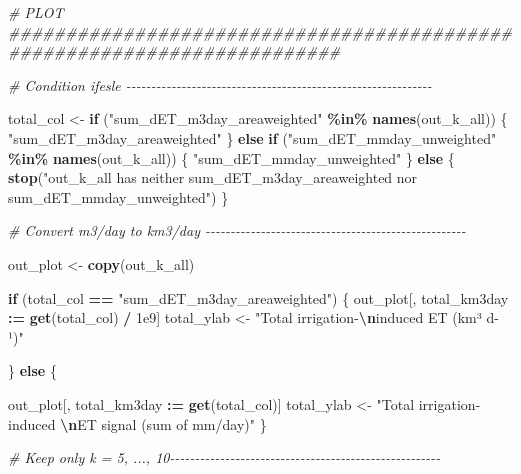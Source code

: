 \documentclass[
  11pt,
]{article}
\newenvironment{Shaded}{\begin{snugshade}}{\end{snugshade}}
\newcommand{\CommentTok}[1]{\textcolor[rgb]{0.56,0.35,0.01}{\textit{#1}}}
\newcommand{\ControlFlowTok}[1]{\textcolor[rgb]{0.13,0.29,0.53}{\textbf{#1}}}
\newcommand{\FloatTok}[1]{\textcolor[rgb]{0.00,0.00,0.81}{#1}}
\newcommand{\FunctionTok}[1]{\textcolor[rgb]{0.13,0.29,0.53}{\textbf{#1}}}
\newcommand{\NormalTok}[1]{#1}
\newcommand{\OtherTok}[1]{\textcolor[rgb]{0.56,0.35,0.01}{#1}}
\newcommand{\SpecialCharTok}[1]{\textcolor[rgb]{0.81,0.36,0.00}{\textbf{#1}}}
\newcommand{\StringTok}[1]{\textcolor[rgb]{0.31,0.60,0.02}{#1}}
\begin{document}
\begin{Shaded}
\begin{Highlighting}[]
\CommentTok{\# PLOT \#\#\#\#\#\#\#\#\#\#\#\#\#\#\#\#\#\#\#\#\#\#\#\#\#\#\#\#\#\#\#\#\#\#\#\#\#\#\#\#\#\#\#\#\#\#\#\#\#\#\#\#\#\#\#\#\#\#\#\#\#\#\#\#\#\#\#\#\#\#\#\#\#}

\CommentTok{\# Condition ifesle {-}{-}{-}{-}{-}{-}{-}{-}{-}{-}{-}{-}{-}{-}{-}{-}{-}{-}{-}{-}{-}{-}{-}{-}{-}{-}{-}{-}{-}{-}{-}{-}{-}{-}{-}{-}{-}{-}{-}{-}{-}{-}{-}{-}{-}{-}{-}{-}{-}{-}{-}{-}{-}{-}{-}{-}{-}{-}{-}{-}{-}}

\NormalTok{total\_col }\OtherTok{\textless{}{-}} \ControlFlowTok{if}\NormalTok{ (}\StringTok{"sum\_dET\_m3day\_areaweighted"} \SpecialCharTok{\%in\%} \FunctionTok{names}\NormalTok{(out\_k\_all)) \{}
  \StringTok{"sum\_dET\_m3day\_areaweighted"}
\NormalTok{\} }\ControlFlowTok{else} \ControlFlowTok{if}\NormalTok{ (}\StringTok{"sum\_dET\_mmday\_unweighted"} \SpecialCharTok{\%in\%} \FunctionTok{names}\NormalTok{(out\_k\_all)) \{}
  \StringTok{"sum\_dET\_mmday\_unweighted"}
\NormalTok{\} }\ControlFlowTok{else}\NormalTok{ \{}
  \FunctionTok{stop}\NormalTok{(}\StringTok{"out\_k\_all has neither sum\_dET\_m3day\_areaweighted nor sum\_dET\_mmday\_unweighted"}\NormalTok{)}
\NormalTok{\}}

\CommentTok{\# Convert m3/day to km3/day {-}{-}{-}{-}{-}{-}{-}{-}{-}{-}{-}{-}{-}{-}{-}{-}{-}{-}{-}{-}{-}{-}{-}{-}{-}{-}{-}{-}{-}{-}{-}{-}{-}{-}{-}{-}{-}{-}{-}{-}{-}{-}{-}{-}{-}{-}{-}{-}{-}{-}{-}{-}}

\NormalTok{out\_plot }\OtherTok{\textless{}{-}} \FunctionTok{copy}\NormalTok{(out\_k\_all)}

\ControlFlowTok{if}\NormalTok{ (total\_col }\SpecialCharTok{==} \StringTok{"sum\_dET\_m3day\_areaweighted"}\NormalTok{) \{}
\NormalTok{  out\_plot[, total\_km3day }\SpecialCharTok{:=} \FunctionTok{get}\NormalTok{(total\_col) }\SpecialCharTok{/} \FloatTok{1e9}\NormalTok{]}
\NormalTok{  total\_ylab }\OtherTok{\textless{}{-}} \StringTok{"Total irrigation{-}}\SpecialCharTok{\textbackslash{}n}\StringTok{induced ET (km³ d{-}¹)"}

\NormalTok{\} }\ControlFlowTok{else}\NormalTok{ \{}

\NormalTok{  out\_plot[, total\_km3day }\SpecialCharTok{:=} \FunctionTok{get}\NormalTok{(total\_col)]}
\NormalTok{  total\_ylab }\OtherTok{\textless{}{-}} \StringTok{"Total irrigation{-}induced }\SpecialCharTok{\textbackslash{}n}\StringTok{ET signal (sum of mm/day)"}
\NormalTok{\}}

\CommentTok{\# Keep only k = 5, ..., 10{-}{-}{-}{-}{-}{-}{-}{-}{-}{-}{-}{-}{-}{-}{-}{-}{-}{-}{-}{-}{-}{-}{-}{-}{-}{-}{-}{-}{-}{-}{-}{-}{-}{-}{-}{-}{-}{-}{-}{-}{-}{-}{-}{-}{-}{-}{-}{-}{-}{-}{-}{-}{-}{-}}


\end{Highlighting}
\end{Shaded}
\end{document}
